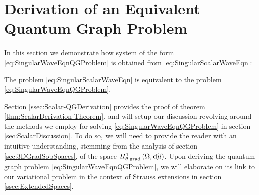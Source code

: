 \section{Derivation of an Equivalent Quantum Graph Problem} \label{sec:ScalarDerivation}
In this section we demonstrate how system of the form \eqref{eq:SingularWaveEqnQGProblem} is obtained from \eqref{eq:SingularScalarWaveEqn}:
\begin{theorem} \label{thm:ScalarDerivation-Theorem}
	The problem \eqref{eq:SingularScalarWaveEqn} is equivalent to the problem \eqref{eq:SingularWaveEqnQGProblem}.
\end{theorem}
Section \ref{ssec:Scalar-QGDerivation} provides the proof of theorem \ref{thm:ScalarDerivation-Theorem}, and will setup our discussion revolving around the methods we employ for solving \eqref{eq:SingularWaveEqnQGProblem} in section \ref{sec:ScalarDiscussion}.
To do so, we will need to provide the reader with an intuitive understanding, stemming from the analysis of section \ref{sec:3DGradSobSpaces}, of the space $H^1_{\theta, \mathrm{grad}}\left( \Omega, \mathrm{d}\widetilde{\mu} \right)$.
Upon deriving the quantum graph problem \eqref{eq:SingularWaveEqnQGProblem}, we will elaborate on its link to our variational problem in the context of Strauss extensions in section \ref{ssec:ExtendedSpaces}.



